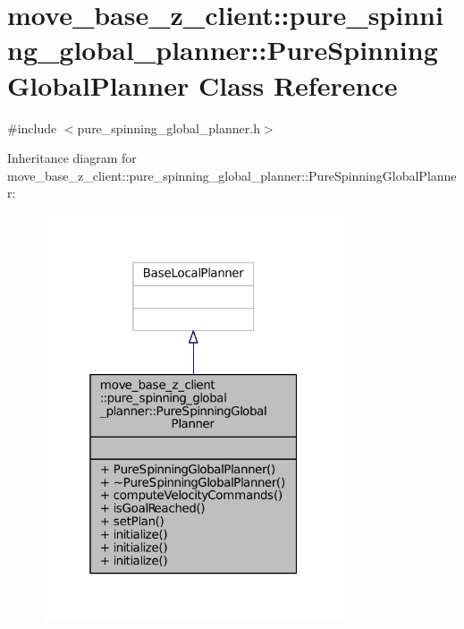 \hypertarget{classmove__base__z__client_1_1pure__spinning__global__planner_1_1PureSpinningGlobalPlanner}{}\section{move\+\_\+base\+\_\+z\+\_\+client\+:\+:pure\+\_\+spinning\+\_\+global\+\_\+planner\+:\+:Pure\+Spinning\+Global\+Planner Class Reference}
\label{classmove__base__z__client_1_1pure__spinning__global__planner_1_1PureSpinningGlobalPlanner}


{\ttfamily \#include $<$pure\+\_\+spinning\+\_\+global\+\_\+planner.\+h$>$}



Inheritance diagram for move\+\_\+base\+\_\+z\+\_\+client\+:\+:pure\+\_\+spinning\+\_\+global\+\_\+planner\+:\+:Pure\+Spinning\+Global\+Planner\+:
\nopagebreak
\begin{figure}[H]
\begin{center}
\leavevmode
\includegraphics[width=253pt]{classmove__base__z__client_1_1pure__spinning__global__planner_1_1PureSpinningGlobalPlanner__inherit__graph}
\end{center}
\end{figure}


